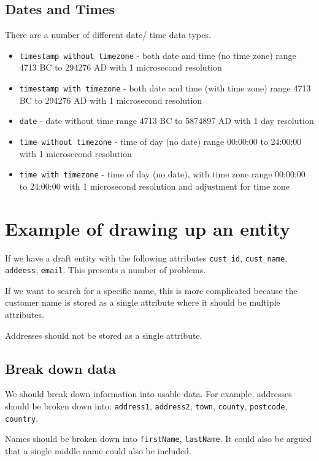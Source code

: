 \subsection*{Dates and Times}
There are a number of different date/ time data types.
\begin{itemize}
    \item \texttt{timestamp without timezone} - both date and time (no time zone) range 4713 BC to 294276 AD with 1 microsecond resolution
    \item \texttt{timestamp with timezone} - both date and time (with time zone) range 4713 BC to 294276 AD with 1 microsecond resolution
    \item \texttt{date} - date without time range 4713 BC to 5874897 AD with 1 day resolution
    \item \texttt{time without timezone} - time of day (no date) range 00:00:00 to 24:00:00 with 1 microsecond resolution
    \item \texttt{time with timezone} - time of day (no date), with time zone range 00:00:00 to 24:00:00 with 1 microsecond resolution and adjustment for time zone
\end{itemize}

\section*{Example of drawing up an entity}
If we have a draft entity with the following attributes \texttt{cust\_id}, \texttt{cust\_name}, \texttt{addeess}, \texttt{email}. This presents a number of problems.

If we want to search for a specific name, this is more complicated because the customer name is stored as a single attribute where it should be multiple attributes.

Addresses should not be stored as a single attribute.
\subsection*{Break down data}
We should break down information into usable data. For example, addresses should be broken down into: \texttt{address1}, \texttt{address2}, \texttt{town}, \texttt{county}, \texttt{postcode}, \texttt{country}.

Names should be broken down into \texttt{firstName}, \texttt{lastName}. It could also be argued that a single middle name could also be included.

